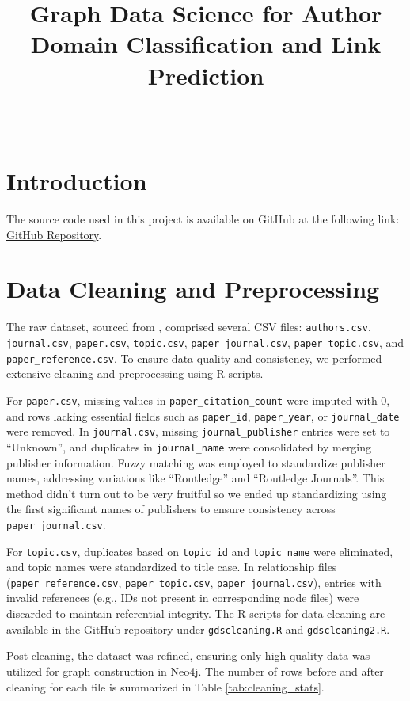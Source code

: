 \documentclass[conference, 12pt]{IEEEtran}
\title{Graph Data Science for Author Domain Classification and Link Prediction}
\author{\IEEEauthorblockN{Basil Ali Khan, Hamza Ansari, Hayyan Khan} \\
\IEEEauthorblockA{Group 6\\ Graph Data Science, Spring 2025}}
\begin{document}
\maketitle

\section{Introduction}
The source code used in this project is available on GitHub at the following link: 
\href{https://github.com/basil-ali-khan/Node_Classification_and_Link_Prediction_Using_Neo4j}{GitHub Repository}.

\section{Data Cleaning and Preprocessing}
The raw dataset, sourced from \cite{10.1162/qss_a_00163}, comprised several CSV files: \texttt{authors.csv}, \texttt{journal.csv}, \texttt{paper.csv}, \texttt{topic.csv}, \texttt{paper\_journal.csv}, \texttt{paper\_topic.csv}, and \texttt{paper\_reference.csv}. To ensure data quality and consistency, we performed extensive cleaning and preprocessing using R scripts.

For \texttt{paper.csv}, missing values in \texttt{paper\_citation\_count} were imputed with 0, and rows lacking essential fields such as \texttt{paper\_id}, \texttt{paper\_year}, or \texttt{journal\_date} were removed. In \texttt{journal.csv}, missing \texttt{journal\_publisher} entries were set to ``Unknown'', and duplicates in \texttt{journal\_name} were consolidated by merging publisher information. Fuzzy matching was employed to standardize publisher names, addressing variations like ``Routledge'' and ``Routledge Journals''. This method didn't turn out to be very fruitful so we ended up standardizing using the first significant names of publishers to ensure consistency across \texttt{paper\_journal.csv}.

For \texttt{topic.csv}, duplicates based on \texttt{topic\_id} and \texttt{topic\_name} were eliminated, and topic names were standardized to title case. In relationship files (\texttt{paper\_reference.csv}, \texttt{paper\_topic.csv}, \texttt{paper\_journal.csv}), entries with invalid references (e.g., IDs not present in corresponding node files) were discarded to maintain referential integrity. The R scripts for data cleaning are available in the GitHub repository under \texttt{gdscleaning.R} and \texttt{gdscleaning2.R}.

Post-cleaning, the dataset was refined, ensuring only high-quality data was utilized for graph construction in Neo4j. The number of rows before and after cleaning for each file is summarized in Table \ref{tab:cleaning_stats}. 
\end{document}
